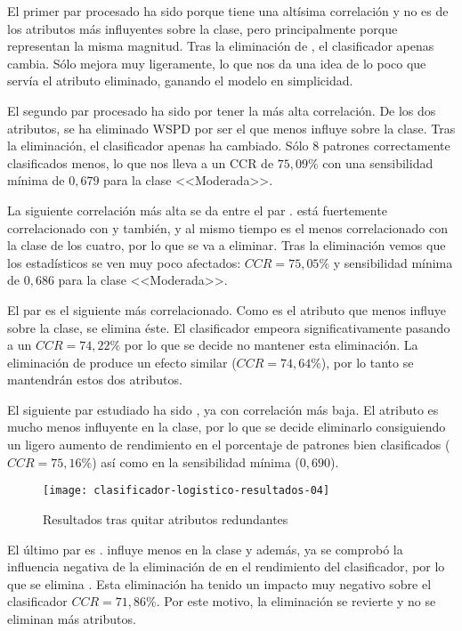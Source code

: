 El primer par procesado ha sido  porque tiene una altísima correlación y no es de los atributos más influyentes sobre la clase, pero principalmente porque representan la misma magnitud. Tras la eliminación de , el clasificador apenas cambia. Sólo mejora muy ligeramente, lo que nos da una idea de lo poco que servía el atributo eliminado, ganando el modelo en simplicidad.

El segundo par procesado ha sido  por tener la más alta correlación. De los dos atributos, se ha eliminado WSPD por ser el que menos influye sobre la clase. Tras la eliminación, el clasificador apenas ha cambiado. Sólo 8 patrones correctamente clasificados menos, lo que nos lleva a un CCR de $75,09\%$ con una sensibilidad mínima de $0,679$ para la clase <<Moderada>>.

La siguiente correlación más alta se da entre el par .  está fuertemente correlacionado con  y  también, y al mismo tiempo es el menos correlacionado con la clase de los cuatro, por lo que se va a eliminar. Tras la eliminación vemos que los estadísticos se ven muy poco afectados: $CCR=75,05\%$ y sensibilidad mínima de $0,686$ para la clase <<Moderada>>.

El par  es el siguiente más correlacionado. Como  es el atributo que menos influye sobre la clase, se elimina éste. El clasificador empeora significativamente pasando a un $CCR=74,22\%$ por lo que se decide no mantener esta eliminación. La eliminación de  produce un efecto similar ($CCR=74,64\%$), por lo tanto se mantendrán estos dos atributos.

El siguiente par estudiado ha sido , ya con correlación más baja. El atributo  es mucho menos influyente en la clase, por lo que se decide eliminarlo consiguiendo un ligero aumento de rendimiento en el porcentaje de patrones bien clasificados ($CCR=75,16\%$) así como en la sensibilidad mínima ($0,690$).

\begin{figure}[H]
    \centering
    \texttt{[image: clasificador-logistico-resultados-04]}
    \caption{Resultados tras quitar atributos redundantes}
    \label{fig:clasificador-logistico-resultados-04}
\end{figure}

El último par es .  influye menos en la clase y además, ya se comprobó la influencia negativa de la eliminación de  en el rendimiento del clasificador, por lo que se elimina . Esta eliminación ha tenido un impacto muy negativo sobre el clasificador $CCR=71,86\%$. Por este motivo, la eliminación se revierte y no se eliminan más atributos.

